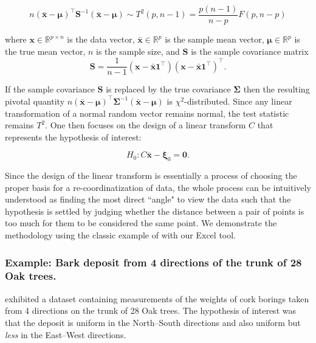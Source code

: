 \documentclass[article]{jss}
\begin{document}
        \[n{\left( {\bar{\textbf{x}} - {\boldsymbol{\mu}}} \right)^ \intercal}{\textbf{S}^{ - 1}}\left( {\bar{\textbf{x}} - {\boldsymbol{\mu}}} \right) \sim T^2(p, n-1) = \frac{{p\left( {n - 1} \right)}}{{n - p}}F\left( {p,n - p} \right) \]
        
        where $\textbf{x} \in \mathbb{R}^{p\times n}$ is the data vector, 
        $\bar{\textbf{x}} \in \mathbb{R}^p$ is the sample mean vector, 
        $\boldsymbol{\mu} \in \mathbb{R}^p$ is the true mean vector,
        $n$ is the sample size, and 
        $\textbf{S}$ is the sample covariance matrix
        \[\textbf{S} = \frac{1}{{n - 1}}\left( {\textbf{x} - \bar{\textbf{x}}{\textbf{1}^\intercal}} \right){\left( {\textbf{x} - \bar{\textbf{x}}{\textbf{1}^\intercal}} \right)^\intercal}.\]
        
        
        If the sample covariance $\textbf{S}$ is replaced by the true covariance
        $\boldsymbol{\Sigma}$ then the resulting pivotal quantity $n{\left( {\bar{\textbf{x}} - {\boldsymbol{\mu}}} \right)^ \intercal}{\boldsymbol{\Sigma}^{ - 1}}\left( {\bar{\textbf{x}} - {\boldsymbol{\mu}}} \right)$
        is $\chi^2$-distributed.
        Since any linear transformation of a normal random vector remains normal, the test statistic remains $T^2$. One then focuses on the design of a linear transform $C$ that represents the hypothesis of interest: 
        
        \[H_0: C\bar{\textbf{x}} - \boldsymbol{\xi}_0 = \textbf{0}.\]
        
        
        
        Since the design of the linear transform is essentially a process of choosing the proper basis for a re-coordinatization of data, the whole process can be intuitively understood as finding the most direct ``angle" to view the data such that the hypothesis is settled by judging whether the distance between a pair of points is too much for them to be considered the same point. We demonstrate the methodology using the classic example of \cite{rao1948corkboring} with our Excel tool.
        
        
        
        \subsubsection{Example: Bark deposit from 4 directions of the trunk of 28 Oak trees.}
        
        \cite{rao1948corkboring} exhibited a dataset containing measurements of the weights of  cork borings taken from 4 directions on the trunk of 28 Oak trees. The hypothesis of interest was that the deposit is uniform in the North--South directions and also uniform but \emph{less} in the East--West directions.
        
\end{document}
